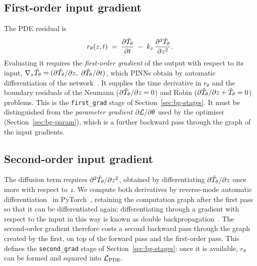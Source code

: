 \subsection{First-order input gradient}
\label{sec:bg-first}
The PDE residual is
\begin{equation}
  r_\theta(z,t) \;=\; \frac{\partial \hat T_\theta}{\partial t} \;-\; k_z\,\frac{\partial^2 \hat T_\theta}{\partial z^2}.
\end{equation}
Evaluating it requires the \emph{first-order gradient} of the output with respect to its input,
$\nabla_x \Th = (\partial\Th/\partial z,\ \partial\Th/\partial t)$, which PINNs obtain by
automatic differentiation of the network~\cite{raissi2019,lu2021deepxde,baydin2017}. It supplies the time derivative in $r_\theta$
and the boundary residuals of the Neumann ($\partial\hat T_\theta/\partial z = 0$) and Robin
($\partial\hat T_\theta/\partial z + \hat T_\theta = 0$) problems. This is the \texttt{first\_grad} stage of
Section~\ref{sec:bg-stages}. It must be distinguished from the \emph{parameter gradient}
$\partial\mathcal{L}/\partial\theta$ used by the optimiser (Section~\ref{sec:bg-param}), which is a further
backward pass through the graph of the input gradients.

\subsection{Second-order input gradient}
\label{sec:bg-second}
The diffusion term requires $\partial^2\hat T_\theta/\partial z^2$, obtained by differentiating
$\partial\hat T_\theta/\partial z$ once more with respect to $z$. We compute both derivatives by reverse-mode
automatic differentiation~\cite{baydin2017} in PyTorch~\cite{paszke2017autodiff}, retaining the computation
graph after the first pass so that it can be differentiated again; differentiating through a gradient
with respect to the input in this way is known as double backpropagation~\cite{drucker1992}. The second-order gradient therefore costs a second backward pass through the
graph created by the first, on top of the forward pass and the first-order pass. This defines the
\texttt{second\_grad} stage of Section~\ref{sec:bg-stages}: once it is available, $r_\theta$ can be formed and
squared into $\mathcal{L}_{\text{PDE}}$.

